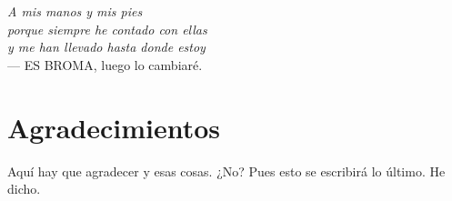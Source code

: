 
\begin{flushright}{\slshape
   A mis manos y mis pies \\
   porque siempre he contado con ellas \\
   y me han llevado hasta donde estoy \\}  \medskip
    --- {ES BROMA, luego lo cambiaré.}
\end{flushright}

\bigskip

\begingroup
\let\clearpage\relax
\let\cleardoublepage\relax
\let\cleardoublepage\relax
\chapter*{Agradecimientos}

Aquí hay que agradecer y esas cosas. ¿No? Pues esto se escribirá lo último. He dicho.



\endgroup



